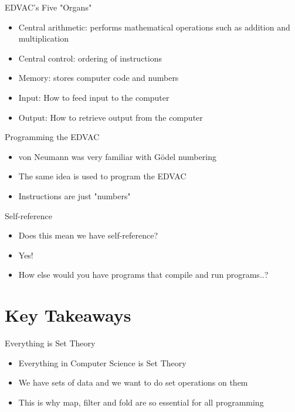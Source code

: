 \documentclass[utf8]{beamer}
\begin{document}
\begin{frame}{EDVAC's Five "Organs"}
\begin{itemize}
\item Central arithmetic: performs mathematical operations such as addition and multiplication
\item Central control: ordering of instructions
\item Memory: stores computer code and numbers
\item Input: How to feed input to the computer
\item Output: How to retrieve output from the computer
\end{itemize}
\end{frame}

\begin{frame}{Programming the EDVAC}
\begin{itemize}
\item von Neumann was very familiar with G{\"o}del numbering
\item The same idea is used to program the EDVAC
\item Instructions are just "numbers"
\end{itemize}
\end{frame}

\begin{frame}{Self-reference}
\begin{itemize}
\item Does this mean we have self-reference?
\item Yes!
\item How else would you have programs that compile and run programs..?
\end{itemize}
\end{frame}

\part{Key Takeaways}
\begin{frame}
\partpage
\end{frame}

\begin{frame}{Everything is Set Theory}
\begin{itemize}
\item Everything in Computer Science is Set Theory
\item We have sets of data and we want to do set operations on them
\item This is why map, filter and fold are so essential for all programming
\end{itemize}
\end{frame}
\end{document}
